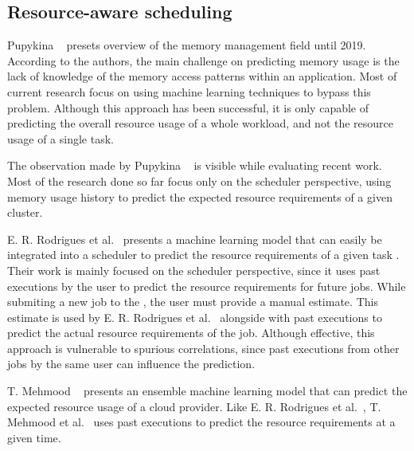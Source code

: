 \subsection{Resource-aware scheduling}
\label{subsec:resource-aware-scheduling}

Pupykina ~\cite{pupykina2019} presets  overview of the memory management field until 2019.
According to the authors, the main challenge on predicting memory usage is the lack of knowledge of the memory access patterns within an application.
Most of current research focus on using machine learning techniques to bypass this problem.
Although this approach has been successful, it is only capable of predicting the overall resource usage of a whole workload, and not the resource usage of a single task.

The observation made by Pupykina ~\cite{pupykina2019} is visible while evaluating recent work.
Most of the research done so far focus only on the scheduler perspective, using memory usage history to predict the expected resource requirements of a given cluster.

E. R. Rodrigues et al.~\cite{rodrigues2016} presents a machine learning model that can easily be integrated into a scheduler to predict the resource requirements of a given task .
Their work is mainly focused on the scheduler perspective, since it uses past executions by the user to predict the resource requirements for future jobs.
While submiting a new job to the , the user must provide a manual estimate.
This estimate is used by E. R. Rodrigues et al.~\cite{rodrigues2016} alongside with past executions to predict the actual resource requirements of the job.
Although effective, this approach is vulnerable to spurious correlations, since past executions from other jobs by the same user can influence the prediction.

T. Mehmood ~\cite{mehmood2018} presents an ensemble machine learning model that can predict the expected resource usage of a  cloud provider.
Like E. R. Rodrigues et al.~\cite{rodrigues2016}, T. Mehmood et al.~\cite{mehmood2018} uses past executions to predict the resource requirements at a given time.

